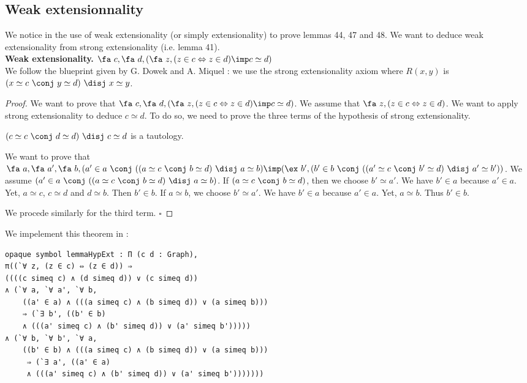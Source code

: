 \documentclass[a4paper]{article}
\begin{document}
\subsection{Weak extensionnality}

\label{extensionality}

We notice in \cite{zermodulo53} the use of weak extensionality (or simply extensionality) to prove lemmas 44, 47 and 48. We want to deduce weak extensionality from strong extensionality (i.e. lemma 41). \\

\textbf{Weak extensionality.} $\fa~c,\fa~d, (\fa~z, (z \in c \Leftrightarrow z \in d) \imp c \simeq d)$ \\

We follow the blueprint given by G. Dowek and A. Miquel \cite{zermodulo} : we use the strong extensionality axiom where $R(x,y)$ is $(x \simeq c~\conj~y \simeq d)~\disj~x \simeq y$. \\

\begin{proof}
We want to prove that $\fa~c,\fa~d, (\fa~z, (z \in c \Leftrightarrow z \in d) \imp c \simeq d)$. We assume that $\fa~z, (z \in c \Leftrightarrow z \in d)$. We want to apply strong extensionality to deduce $c \simeq d$. To do so, we need to prove the three terms of the hypothesis of strong extensionality.

$(c \simeq c~\conj~d \simeq d)~\disj~c \simeq d$ is a tautology.

We want to prove that $\fa~a,\fa~a',\fa~b, (a' \in a~\conj~((a \simeq c~\conj~b \simeq d)~\disj~a \simeq b) \imp (\ex~b', (b' \in b~\conj~((a' \simeq c~\conj~b' \simeq d)~\disj~a' \simeq b'))$. We assume $(a' \in a~\conj~((a \simeq c~\conj~b \simeq d)~\disj~a \simeq b)$. If $(a \simeq c~\conj~b \simeq d)$, then we choose $b' \simeq a'$. We have $b' \in a$ because $a' \in a$. Yet, $a \simeq c$, $c \simeq d$ and $d \simeq b$. Then $b' \in b$. If $a \simeq b$, we choose $b' \simeq a'$. We have $b' \in a$ because $a' \in a$. Yet, $a \simeq b$. Thus $b' \in b$.

We procede similarly for the third term. $\square$
\end{proof}

We impelement this theorem in \dedukti:

\begin{lstlisting}
opaque symbol lemmaHypExt : Π (c d : Graph), 
π((`∀ z, (z ∈ c) ⇔ (z ∈ d)) ⇒ 
((((c simeq c) ∧ (d simeq d)) ∨ (c simeq d))
∧ (`∀ a, `∀ a', `∀ b, 
	((a' ∈ a) ∧ (((a simeq c) ∧ (b simeq d)) ∨ (a simeq b))) 
	⇒ (`∃ b', ((b' ∈ b) 
	∧ (((a' simeq c) ∧ (b' simeq d)) ∨ (a' simeq b')))))
∧ (`∀ b, `∀ b', `∀ a, 
	((b' ∈ b) ∧ (((a simeq c) ∧ (b simeq d)) ∨ (a simeq b)))
	 ⇒ (`∃ a', ((a' ∈ a) 
	 ∧ (((a' simeq c) ∧ (b' simeq d)) ∨ (a' simeq b')))))))
\end{lstlisting}
\end{document}
